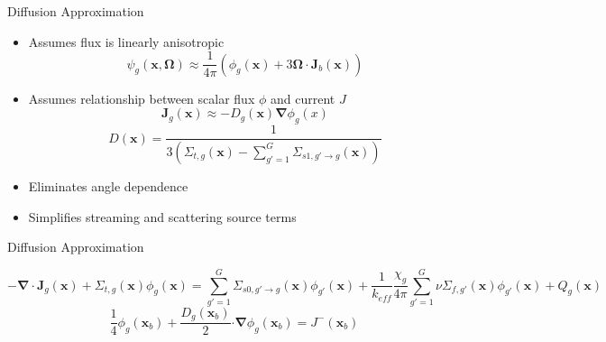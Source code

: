 
\begin{frame}[t]{Diffusion Approximation}
    
    \begin{itemize}
      \item Assumes flux is linearly anisotropic
      \begin{equation*}
       \psi_g\left(\bm x,\bm \Omega\right) \approx 
       \frac{1}{4\pi}\left(\phi_g\left(\bm x\right) + 3\bm \Omega \cdot \bm 
       J_b\left(\bm x\right)\right)
      \end{equation*}
      \item Assumes relationship between scalar flux $\phi$ and current $J$
      \begin{equation*}
      \bm J_g\left(\bm x\right) \approx -D_g\left(\bm x\right) \bm \nabla 
      \phi_g\left(x\right)
      \end{equation*}
      \begin{equation*}
      D\left(\bm x\right)  = \frac{1}{3\left(\Sigma_{t,g}\left(\bm 
      x\right)-\sum_{g'=1}^G \Sigma_{s1,g'\rightarrow g}\left(\bm 
      x\right)\right)}
      \end{equation*}
      \item Eliminates angle dependence
      \item Simplifies streaming and scattering source terms
    \end{itemize}
  
\end{frame}


\begin{frame}[t]{Diffusion Approximation}
  
    \begin{dmath*}\label{e:DiffusionEquation}
        {-\bm\nabla \cdot \bm J_g\left(\bm 
        x\right) + \Sigma_{t,g}\left(\bm x\right)\phi_g\left(\bm x\right) = 
        \sum_{g'=1}^G \Sigma_{s0,g'\rightarrow g}\left(\bm 
        x\right)\phi_{g'}\left(\bm x\right)} + 
        {\frac{1}{k_{eff}}\frac{\chi_g}{4\pi} \sum_{g'=1}^G 
        \nu\Sigma_{f,g'}\left(\bm x\right)\phi_{g'}\left(\bm x\right)} + 
        Q_g\left(\bm x\right)
    \end{dmath*}
    \begin{equation*}\label{e:DiffusionEquationBC}
    \frac{1}{4} \phi_g\left(\bm x_b\right) + \frac{D_g\left(\bm x_b\right)}{2} 
    \bm \cdot \bm \nabla \phi_g\left(\bm x_b\right) = J^-\left(\bm x_b\right)
    \end{equation*}
    
\end{frame}

